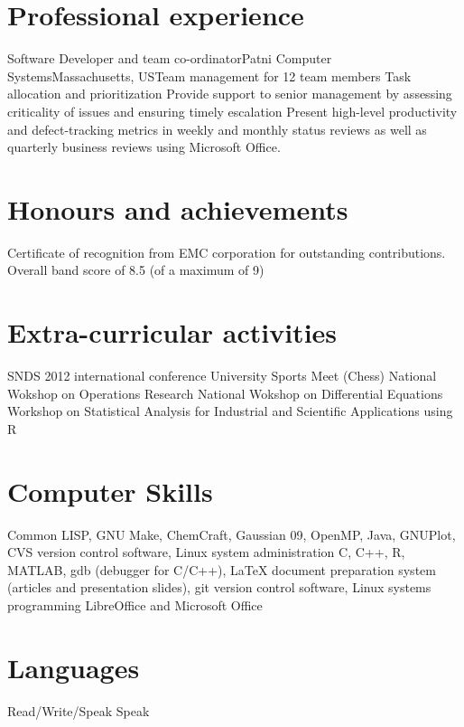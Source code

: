 \documentclass [a4paper,11pt]{moderncv}
\begin{document}
\section{Professional experience}
 {Software Developer and team co-ordinator}{Patni Computer Systems}{Massachusetts, US}{}{Team management for 12 team members \newline{} Task allocation and prioritization \newline{} Provide support to senior management by assessing criticality of issues and ensuring timely escalation \newline{} Present high-level productivity and defect-tracking metrics in weekly and monthly status reviews as well as quarterly business reviews using Microsoft Office.}

\section {Honours and achievements}
\cvline {} {Certificate of recognition from EMC corporation for outstanding contributions.}
 {Overall band score of 8.5 (of a maximum of 9)}

\section {Extra-curricular activities}
 {SNDS 2012 international conference}
 {University Sports Meet (Chess)}
 {National Wokshop on Operations Research}
 {National Wokshop on Differential Equations}
 {Workshop on Statistical Analysis for Industrial and Scientific Applications using R}

\section{Computer Skills}
 {Common LISP, GNU Make, ChemCraft, Gaussian 09, OpenMP, Java, GNUPlot, CVS version control software,  Linux system administration}
 {C, C++, R, MATLAB, gdb (debugger for C/C++), \LaTeX \hspace{1pt} document preparation system (articles and presentation slides), git version control software, Linux systems programming}
 {LibreOffice and Microsoft Office}

\section{Languages}
 {Read/Write/Speak}
 {Speak}
\end{document}
